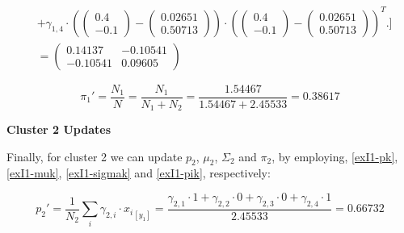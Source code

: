 \documentclass[12pt]{article}
\begin{document}
\begin{enumerate}[leftmargin=\labelsep]
\begin{align*}
                    & + \gamma_{1,4} \cdot \left(\begin{pmatrix} 0.4 \\ -0.1 \end{pmatrix} - \begin{pmatrix} 0.02651 \\ 0.50713 \end{pmatrix}\right) \cdot \left(\begin{pmatrix} 0.4 \\ -0.1 \end{pmatrix} - \begin{pmatrix} 0.02651 \\ 0.50713 \end{pmatrix}\right)^T
          \Bigg. \Bigg]                                                                                                                                                                                                                                                \\
                    & = \begin{pmatrix} 0.14137 & -0.10541 \\ -0.10541 & 0.09605 \end{pmatrix}
        \end{align*}
        \endgroup

        \begin{equation*}
          \pi_1' = \frac{N_1}{N} = \frac{N_1}{N_1 + N_2} = \frac{1.54467}{1.54467 + 2.45533} = 0.38617
        \end{equation*}

        \begin{center}
          \textbf{\colorbox{byellow}{Cluster 2 Updates}}
        \end{center}

        Finally, for cluster 2 we can update $p_2$, $\mu_2$, $\Sigma_2$ and $\pi_2$, by employing, \eqref{exI1-pk}, \eqref{exI1-muk},
        \eqref{exI1-sigmak} and \eqref{exI1-pik}, respectively:

        \begingroup
        \allowdisplaybreaks
        \begin{equation*}
          p_2' = \frac{1}{N_2} \sum_{i} \gamma_{2,i} \cdot {x_i}_{[y_1]}
          = \frac{\gamma_{2,1} \cdot 1
            + \gamma_{2,2} \cdot 0
            + \gamma_{2,3} \cdot 0
            + \gamma_{2,4} \cdot 1}{2.45533}
          = 0.66732
        \end{equation*}
        \endgroup


\end{enumerate}
\end{document}
